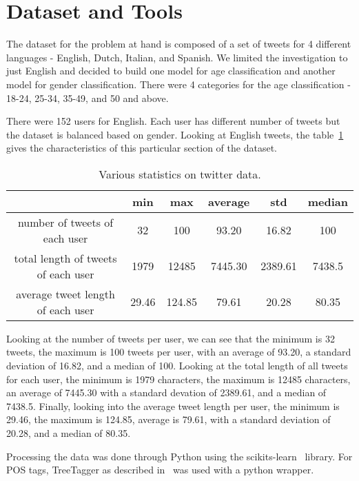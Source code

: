 \documentclass[a4paper]{llncs}
\begin{document}
\section{Dataset and Tools}
The dataset for the problem at hand is composed of a set of tweets for 4 different languages - English, Dutch, Italian, and Spanish. We limited the investigation to just English and decided to build one model for age classification and another model for gender classification. There were 4 categories for the age classification - 18-24, 25-34, 35-49, and 50 and above.

There were 152 users for English. Each user has different number of tweets but the dataset is balanced based on gender. Looking at English tweets, the table~\ref{table:TweetStats} gives the characteristics of this particular section of the dataset.

\begin{table}[!htbp]
\centering
\begin{tabular}{|c|c|c|c|c|c|}
\hline
                                    & min   & max    & average & std     & median \\ \hline
number of tweets of each user       & 32    & 100    & 93.20   & 16.82   & 100    \\ \hline
total length of tweets of each user & 1979  & 12485  & 7445.30 & 2389.61 & 7438.5 \\ \hline
average tweet length of each user   & 29.46 & 124.85 & 79.61   & 20.28   & 80.35  \\ \hline
\end{tabular}
\caption{Various statistics on twitter data.}
\label{table:TweetStats}
\end{table}

Looking at the number of tweets per user, we can see that the minimum is 32 tweets, the maximum is 100 tweets per user, with an average of 93.20, a standard deviation of 16.82, and a median of 100. Looking at the total length of  all tweets for each user, the minimum is 1979 characters, the maximum is 12485 characters, an average of 7445.30 with a standard devation of 2389.61, and a median of 7438.5. Finally, looking into the average tweet length per user, the minimum is 29.46, the maximum is 124.85, average is 79.61, with a standard deviation of 20.28, and a median of 80.35.   

Processing the data was done through Python using the scikits-learn~\cite{scikit-learn} library. For POS tags, TreeTagger as described in~\cite{schmid1994probabilistic} was used with a python wrapper.
\end{document}
